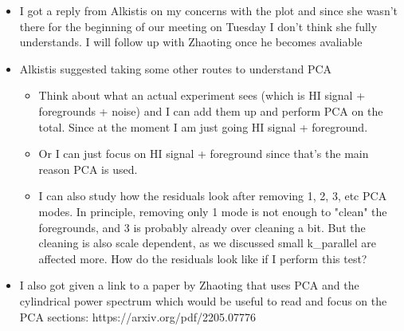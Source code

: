 \begin{itemize}
    \item I got a reply from Alkistis on my concerns with the plot and since she wasn't there for the beginning of our meeting on Tuesday I don't think she fully understands. I will follow up with Zhaoting once he becomes avaliable
    \item Alkistis suggested taking some other routes to understand PCA 
    \begin{itemize}
        \item Think about what an actual experiment sees (which is HI signal + foregrounds + noise) and I can add them up and perform PCA on the total. Since at the moment I am just going HI signal + foreground.
        \item Or I can just focus on HI signal + foreground since that's the main reason PCA is used.
        \item I can also study how the residuals look after removing 1, 2, 3, etc PCA modes. In principle, removing only 1 mode is not enough to "clean" the foregrounds, and 3 is probably already over cleaning a bit. But the cleaning is also scale dependent, as we discussed small k\_parallel are affected more. How do the residuals look like if I perform this test?
    \end{itemize}
\item I also got given a link to a paper by Zhaoting that uses PCA and the cylindrical power spectrum which would be useful to read and focus on the PCA sections: https://arxiv.org/pdf/2205.07776 
\end{itemize}